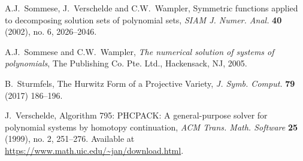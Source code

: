 \documentclass[letter]{amsart}
\theoremstyle{definition}
\begin{document}
\begin{thebibliography}{99}
A.J.~Sommese, J.~Verschelde and C.W.~Wampler,
Symmetric functions applied to decomposing solution sets of polynomial sets,
{\em SIAM J. Numer. Anal.} \textbf{40} (2002), no. 6, 2026--2046.

A.J.~Sommese and C.W.~Wampler, 
{\em The numerical solution of systems of polynomials},
The Publishing Co. Pte. Ltd., Hackensack, NJ, 2005.

B.~Sturmfels, 
The Hurwitz Form of a Projective Variety, 
{\em J. Symb. Comput.} \textbf{79} (2017) 186--196.

J.~Verschelde, 
Algorithm 795: PHCPACK: A general-purpose solver for polynomial systems by homotopy continuation, 
{\em ACM Trans. Math. Software} 
\textbf{25} (1999), no. 2, 251--276.
Available at \url{https://www.math.uic.edu/~jan/download.html}.

\end{thebibliography}
\end{document}
